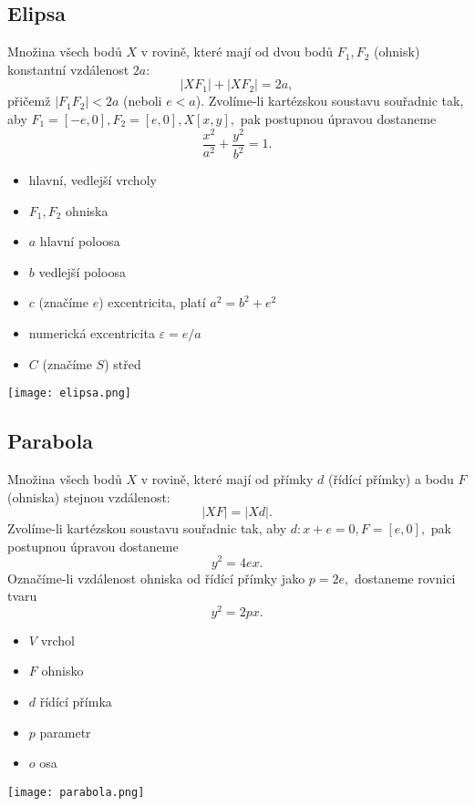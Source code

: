 \subsection*{Elipsa}
Množina všech bodů $X$ v rovině, které mají od dvou bodů $F_1, F_2$
(ohnisk) konstantní vzdálenost $2a$:
$$|XF_1| + |XF_2|=2a,$$
přičemž $|F_1F_2|<2a$ (neboli $e<a$).
Zvolíme-li kartézskou soustavu souřadnic tak, aby $F_1 = [-e,0], F_2=[e,0],
X[x,y],$ pak postupnou úpravou dostaneme
$$\frac{x^2}{a^2}+\frac{y^2}{b^2}=1.$$

\begin{minipage}{0.48\linewidth}
\begin{itemize}
\item hlavní, vedlejší vrcholy
\item $F_1, F_2$ ohniska
\item $a$ hlavní poloosa
\item $b$ vedlejší poloosa
\item $c$ (značíme $e$) excentricita, platí $a^2=b^2+e^2$
\item numerická excentricita $\varepsilon = e/a$
\item $C$ (značíme $S$) střed
\end{itemize}
\end{minipage}
\hfill
\begin{minipage}{0.48\linewidth}
    \texttt{[image: elipsa.png]}
\end{minipage}


\subsection*{Parabola}
Množina všech bodů $X$ v rovině, které mají od přímky $d$ (řídící přímky) a bodu $F$
(ohniska) stejnou vzdálenost:
$$|XF|=|Xd|.$$
Zvolíme-li kartézskou soustavu souřadnic tak, aby $d:x+e=0, F=[e,0],$ pak postupnou
úpravou dostaneme
$$y^2=4ex.$$
Označíme-li vzdálenost ohniska od řídící přímky jako $p=2e,$ dostaneme rovnici tvaru
$$y^2=2px.$$

\begin{minipage}{0.48\linewidth}
\begin{itemize}
\item $V$ vrchol
\item $F$ ohnisko
\item $d$ řídící přímka
\item $p$ parametr
\item $o$ osa
\end{itemize}
\end{minipage}
\hfill
\begin{minipage}{0.40\linewidth}
    \texttt{[image: parabola.png]}
\end{minipage}

